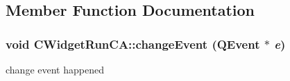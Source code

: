 \subsection{Member Function Documentation}
\hypertarget{classCWidgetRunCA_aa4b0012b7945de59576888d37e880ef6}{
\subsubsection[{changeEvent}]{\setlength{\rightskip}{0pt plus 5cm}void CWidgetRunCA::changeEvent (QEvent $\ast$ {\em e})}}
\label{classCWidgetRunCA_aa4b0012b7945de59576888d37e880ef6}
change event happened


